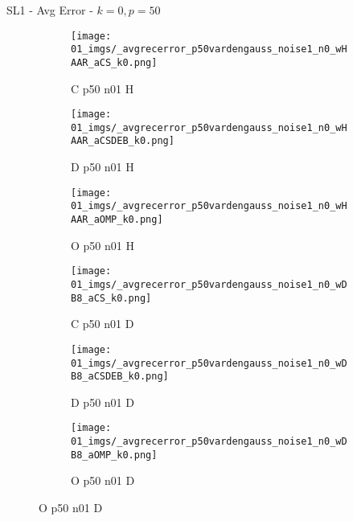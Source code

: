 \begin{frame}{SL1 - Avg Error - $k=0,p=50$}{}
\begin{figure}
\begin{subfigure}{0.13\textwidth}
\texttt{[image: 01\_imgs/\_avgrecerror\_p50vardengauss\_noise1\_n0\_wHAAR\_aCS\_k0.png]}
\caption*{\tiny C p50 n01 H}
\end{subfigure}
\begin{subfigure}{0.13\textwidth}
\texttt{[image: 01\_imgs/\_avgrecerror\_p50vardengauss\_noise1\_n0\_wHAAR\_aCSDEB\_k0.png]}
\caption*{\tiny D p50 n01 H}
\end{subfigure}
\begin{subfigure}{0.13\textwidth}
\texttt{[image: 01\_imgs/\_avgrecerror\_p50vardengauss\_noise1\_n0\_wHAAR\_aOMP\_k0.png]}
\caption*{\tiny O p50 n01 H}
\end{subfigure}
\begin{subfigure}{0.13\textwidth}
\texttt{[image: 01\_imgs/\_avgrecerror\_p50vardengauss\_noise1\_n0\_wDB8\_aCS\_k0.png]}
\caption*{\tiny C p50 n01 D}
\end{subfigure}
\begin{subfigure}{0.13\textwidth}
\texttt{[image: 01\_imgs/\_avgrecerror\_p50vardengauss\_noise1\_n0\_wDB8\_aCSDEB\_k0.png]}
\caption*{\tiny D p50 n01 D}
\end{subfigure}
\begin{subfigure}{0.13\textwidth}
\texttt{[image: 01\_imgs/\_avgrecerror\_p50vardengauss\_noise1\_n0\_wDB8\_aOMP\_k0.png]}
\caption*{\tiny O p50 n01 D}
\end{subfigure}

\vspace{5pt}


\end{figure}
\end{frame}
